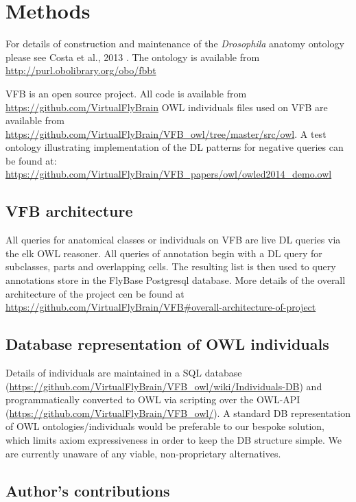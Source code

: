 \documentclass[runningheads,a4paper]{llncs}
\begin{document}
\section{Methods}

For details of construction and maintenance of the \textit{Drosophila}
anatomy ontology please see Costa et al., 2013 \cite{Costa2013}. The
ontology is available from \url{http://purl.obolibrary.org/obo/fbbt}

VFB is an open source project.  All code is available from
\url{https://github.com/VirtualFlyBrain}
OWL individuals files used on VFB are available from
\url{https://github.com/VirtualFlyBrain/VFB_owl/tree/master/src/owl}. A
test ontology illustrating implementation of the DL patterns for
negative queries can be found at:
\url{https://github.com/VirtualFlyBrain/VFB_papers/owl/owled2014_demo.owl}

\subsection{VFB architecture}

All queries for anatomical classes or individuals on VFB are live DL
queries via the elk OWL reasoner.  All queries of annotation begin
with a DL query for subclasses, parts and overlapping cells.  The
resulting list is then used to query annotations store in the FlyBase
Postgresql database.  More details of the overall architecture of the
project cen be found at
\url{https://github.com/VirtualFlyBrain/VFB#overall-architecture-of-project}


\subsection{Database representation of OWL individuals}

Details of individuals are maintained in a SQL database
(\url{https://github.com/VirtualFlyBrain/VFB_owl/wiki/Individuals-DB})
and programmatically converted to OWL via scripting over the OWL-API
(\url{https://github.com/VirtualFlyBrain/VFB_owl/}).  A standard DB
representation of OWL ontologies/individuals would be preferable to
our bespoke solution, which limits axiom expressiveness in order to
keep the DB structure simple.  We are currently unaware of any viable,
non-proprietary alternatives.

\subsection*{Author's contributions}
\end{document}
